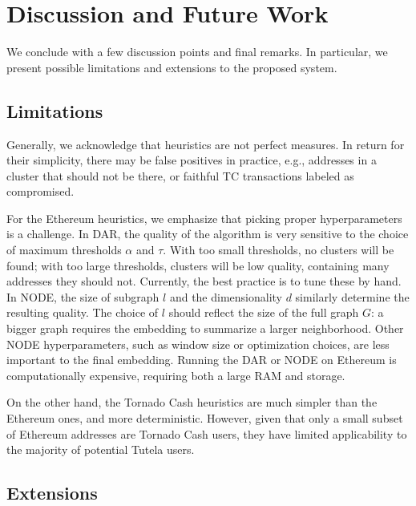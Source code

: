 \section{Discussion and Future Work} \label{sec:discussion}

We conclude with a few discussion points and final remarks. In particular, we present possible limitations and extensions to the proposed system.

\subsection{Limitations}

Generally, we acknowledge that heuristics are not perfect measures. In return for their simplicity, there may be false positives in practice, e.g., addresses in a cluster that should not be there, or faithful TC transactions labeled as compromised.

For the Ethereum heuristics, we emphasize that picking proper hyperparameters is a challenge. In DAR, the quality of the algorithm is very sensitive to the choice of maximum thresholds $\alpha$ and $\tau$. With too small thresholds, no clusters will be found; with too large thresholds, clusters will be low quality, containing many addresses they should not. Currently, the best practice is to tune these by hand. In NODE, the size of subgraph $l$ and the dimensionality $d$ similarly determine the resulting quality. The choice of $l$ should reflect the size of the full graph $G$: a bigger graph requires the embedding to summarize a larger neighborhood. Other NODE hyperparameters, such as window size or optimization choices, are less important to the final embedding. Running the DAR or NODE on Ethereum is computationally expensive, requiring both a large RAM and storage.

On the other hand, the Tornado Cash heuristics are much simpler than the Ethereum ones, and more deterministic.
However, given that only a small subset of Ethereum addresses are Tornado Cash users, they have limited applicability to the majority of potential Tutela users.


\subsection{Extensions}

